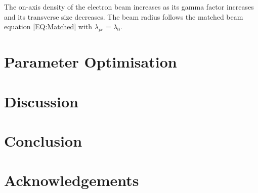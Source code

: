 \documentclass[aps,prstab,reprint,amsmath,amssymb,groupedaddress]{revtex4-1}
\begin{document}
The on-axis density of the electron beam increases as its gamma factor increases and its transverse size decreases. The
beam radius follows the matched beam equation \ref{EQ:Matched} with $\lambda_{pe} = \lambda_{0}$.


\section[\label{S:PO}]{Parameter Optimisation}


\section[\label{S:D}]{Discussion}

\section[\label{S:C}]{Conclusion}

\section[\label{Ack}]{Acknowledgements}
\end{document}
